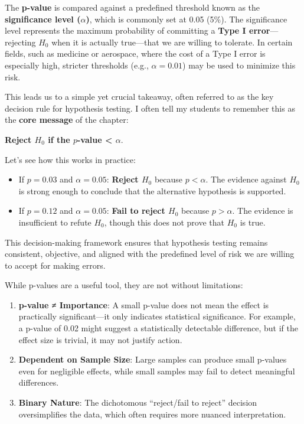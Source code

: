 \documentclass[
]{book}
\providecommand{\tightlist}{%
  \setlength{\itemsep}{0pt}\setlength{\parskip}{0pt}}
\theoremstyle{definition}
\theoremstyle{definition}
\theoremstyle{definition}
\theoremstyle{definition}
\theoremstyle{remark}
\begin{document}
The \textbf{p-value} is compared against a predefined threshold known as the \textbf{significance level (\(\alpha\))}, which is commonly set at 0.05 (5\%). The significance level represents the maximum probability of committing a \textbf{Type I error}---rejecting \(H_0\) when it is actually true---that we are willing to tolerate. In certain fields, such as medicine or aerospace, where the cost of a Type I error is especially high, stricter thresholds (e.g., \(\alpha = 0.01\)) may be used to minimize this risk.

This leads us to a simple yet crucial takeaway, often referred to as the key decision rule for hypothesis testing. I often tell my students to remember this as the \textbf{core message} of the chapter:

\textbf{Reject \(H_0\) if the \(p\)-value \textless{} \(\alpha\)}.

Let's see how this works in practice:

\begin{itemize}
\tightlist
\item
  If \(p = 0.03\) and \(\alpha = 0.05\): \textbf{Reject \(H_0\)} because \(p < \alpha\). The evidence against \(H_0\) is strong enough to conclude that the alternative hypothesis is supported.
\item
  If \(p = 0.12\) and \(\alpha = 0.05\): \textbf{Fail to reject \(H_0\)} because \(p > \alpha\). The evidence is insufficient to refute \(H_0\), though this does not prove that \(H_0\) is true.
\end{itemize}

This decision-making framework ensures that hypothesis testing remains consistent, objective, and aligned with the predefined level of risk we are willing to accept for making errors.

While p-values are a useful tool, they are not without limitations:

\begin{enumerate}
\def\labelenumi{\arabic{enumi}.}
\tightlist
\item
  \textbf{p-value ≠ Importance}: A small p-value does not mean the effect is practically significant---it only indicates statistical significance. For example, a p-value of 0.02 might suggest a statistically detectable difference, but if the effect size is trivial, it may not justify action.
\item
  \textbf{Dependent on Sample Size}: Large samples can produce small p-values even for negligible effects, while small samples may fail to detect meaningful differences.
\item
  \textbf{Binary Nature}: The dichotomous ``reject/fail to reject'' decision oversimplifies the data, which often requires more nuanced interpretation.
\end{enumerate}
\end{document}
